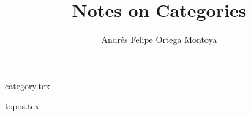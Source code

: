 \documentclass[a4paper, oneside, draft]{book}
\title{Notes on Categories}
\author{Andrés Felipe Ortega Montoya}
\date{}
\begin{document}
\maketitle
\tableofcontents

{category.tex}

{topos.tex}

\printindex
\printbibliography
\listoftodos
\end{document}
